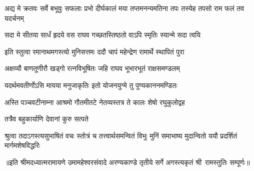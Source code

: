 \threelineshloka
{अद्य मे क्रतवः सर्वे बभूवुः सफलाः प्रभो}
{दीर्घकालं मया तप्तमनन्यमतिना तपः}
{तस्येह तपसो राम फलं तव यदर्चनम्} %

\twolineshloka
{सदा मे सीतया सार्धं हृदये वस राघव}
{गच्छतस्तिष्ठतो वाऽपि स्मृतिः स्यान्मे सदा त्वयि} %

\twolineshloka
{इति स्तुत्वा रमानाथमगस्त्यो मुनिसत्तमः}
{ददौ चापं महेन्द्रेण रामार्थे स्थापितं पुरा} %

\twolineshloka
{अक्षय्यौ बाणतूणीरौ खड्गो रत्नविभूषितः}
{जहि राघव भूभारभूतं राक्षसमण्डलम्} %

\twolineshloka
{यदर्थमवतीर्णोऽसि मायया मनुजाकृतिः}
{इतो योजनयुग्मे तु पुण्यकाननमण्डितः} %

\twolineshloka
{अस्ति पञ्चवटीनाम्ना आश्रमो गौतमीतटे}
{नेतव्यस्तत्र ते कालः शेषो रघुकुलोद्वह} %

\onelineshloka
{तत्रैव बहुकार्याणि देवानां कुरु सत्पते} %


\fourlineindentedshloka
{श्रुत्वा तदाऽगस्त्यसुभाषितं वचः}
{स्तोत्रं च तत्त्वार्थसमन्वितं विभुः}
{मुनिं समाभाष्य मुदान्वितो ययौ}
{प्रदर्शितं मार्गमशेषविद्धरिः} %

{॥इति श्रीमदध्यात्मरामायणे उमामहेश्वरसंवादे अरण्यकाण्डे
तृतीये सर्गे अगस्त्यकृतं श्री~रामस्तुतिः सम्पूर्णः॥}
